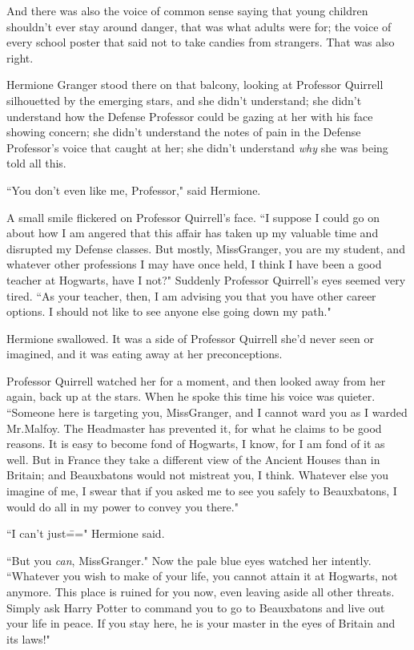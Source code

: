 And there was also the voice of common sense saying that young children shouldn't ever stay around danger, that was what adults were for; the voice of every school poster that said not to take candies from strangers. That was also right.

Hermione Granger stood there on that balcony, looking at Professor Quirrell silhouetted by the emerging stars, and she didn't understand; she didn't understand how the Defense Professor could be gazing at her with his face showing concern; she didn't understand the notes of pain in the Defense Professor's voice that caught at her; she didn't understand \emph{why} she was being told all this.

``You don't even like me, Professor," said Hermione.

A small smile flickered on Professor Quirrell's face. ``I suppose I could go on about how I am angered that this affair has taken up my valuable time and disrupted my Defense classes. But mostly, Miss\?Granger, you are my student, and whatever other professions I may have once held, I think I have been a good teacher at Hogwarts, have I not?" Suddenly Professor Quirrell's eyes seemed very tired. ``As your teacher, then, I am advising you that you have other career options. I should not like to see anyone else going down my path."

Hermione swallowed. It was a side of Professor Quirrell she'd never seen or imagined, and it was eating away at her preconceptions.

Professor Quirrell watched her for a moment, and then looked away from her again, back up at the stars. When he spoke this time his voice was quieter. ``Someone here is targeting you, Miss\?Granger, and I cannot ward you as I warded Mr.\?Malfoy. The Headmaster has prevented it, for what he claims to be good reasons. It is easy to become fond of Hogwarts, I know, for I am fond of it as well. But in France they take a different view of the Ancient Houses than in Britain; and Beauxbatons would not mistreat you, I think. Whatever else you imagine of me, I swear that if you asked me to see you safely to Beauxbatons, I would do all in my power to convey you there."

``I can't just\===" Hermione said.

``But you \emph{can}, Miss\?Granger." Now the pale blue eyes watched her intently. ``Whatever you wish to make of your life, you cannot attain it at Hogwarts, not anymore. This place is ruined for you now, even leaving aside all other threats. Simply ask Harry Potter to command you to go to Beauxbatons and live out your life in peace. If you stay here, he is your master in the eyes of Britain and its laws!"

